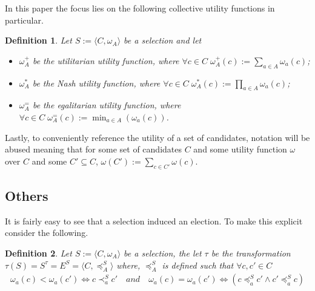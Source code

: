 \documentclass[11pt,a4paper]{article}
\newtheorem{mydef}{Definition}
\newcommand{\pref}{\preceq}
\newcommand{\spref}{\prec}
\begin{document}
In this paper the focus lies on the following collective utility functions in particular.

\begin{mydef}
\label{def:collective_utility_specific}
Let $S:=\langle C, \omega_A\rangle$ be a selection and let
\begin{itemize}
\item $\omega_A^+$ be the \emph{utilitarian} utility function, where $\forall c \in C \; \omega_A^+(c):=\sum_{a \in A} \omega_a(c)$; 
\item $\omega_A^{*}$ be the \emph{Nash} utility function, where $\forall c \in C \; \omega_A^*(c):=\prod_{a \in A} \omega_a(c)$; 
\item $\omega_A^{=}$ be the \emph{egalitarian} utility function, where $\forall c \in C \; \omega_A^=(c):= \min_{a \in A}(\omega_a(c))$.
\end{itemize}
\end{mydef}

Lastly, to conveniently reference the utility of a set of candidates, notation will be abused meaning that for some set of candidates $C$ and some utility function $\omega$ over $C$ and some $C' \subseteq C $, $\omega(C'):=\sum_{c \in C'} \omega(c)$.



\subsection{Others}
It is fairly easy to see that a selection induced an election. To make this explicit consider the following.

\begin{mydef}
\label{def:transformation}
Let $S:=\langle C, \omega_A\rangle$ be a selection, the let $\tau$ be the transformation $\tau(S)=S^{\tau}=E^S=\langle C, \pref_A^{S} \rangle$ where, $\pref_A^{S}$
is defined such that $\forall c,c'\in C$
\begin{equation*}
\begin{split}
\omega_a(c) < \omega_a(c') \iff c \spref_a^{S} c' \quad \mathit{and} 
\quad \omega_a(c) = \omega_a(c') \iff( c \pref_a^{S} c'  \land c' \pref_a^{S} c )
\end{split}
\end{equation*}
\end{mydef}
\end{document}
